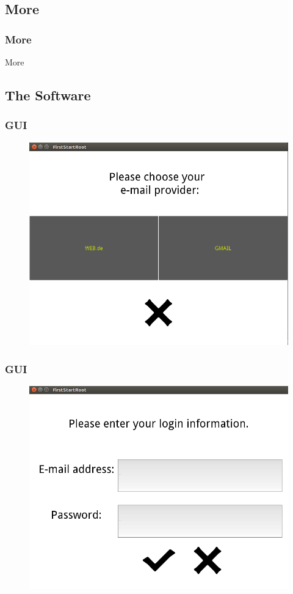 \documentclass[9pt]{beamer}
\begin{document}
			
		\subsection{More}
		
			\begin{frame}
				\frametitle{More}
		    			More
		    		
			\end{frame}
	
		\subsection{The Software}
			\begin{frame}
				\frametitle{GUI}
				\begin{figure}
					\centering
					\includegraphics[scale=0.2]{Images/firstStartRoot.png}
				\end{figure}
		    	\end{frame}
		
			\begin{frame}
				\frametitle{GUI}
				\begin{figure}
					\centering
					\includegraphics[scale=0.2]{Images/firstStartCredentials.png}
				\end{figure}
		    	\end{frame}
			
\end{document}
